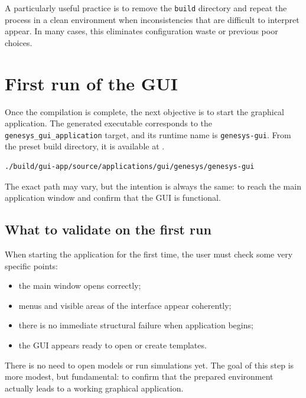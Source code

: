 A particularly useful practice is to remove the \texttt{build} directory and repeat the process in a clean environment when inconsistencies that are difficult to interpret appear. In many cases, this eliminates configuration waste or previous poor choices.

\section{First run of the GUI}
\label{sec:cap2_primeira_execucao_gui}

Once the compilation is complete, the next objective is to start the graphical application. The generated executable corresponds to the \texttt{genesys\_gui\_application} target, and its runtime name is \texttt{genesys-gui}. From the preset build directory, it is available at .

\begin{lstlisting}[language=bash,caption={Generic Example of the First GUI Run},label={lst:cap2_primeira_execucao_gui}]
./build/gui-app/source/applications/gui/genesys/genesys-gui
\end{lstlisting}

The exact path may vary, but the intention is always the same: to reach the main application window and confirm that the GUI is functional.

\subsection{What to validate on the first run}
\label{subsec:cap2_o_que_validar_primeira_execucao}

When starting the application for the first time, the user must check some very specific points:

\begin{itemize}
\item the main window opens correctly;
\item menus and visible areas of the interface appear coherently;
\item there is no immediate structural failure when application begins;
\item the GUI appears ready to open or create templates.
\end{itemize}

There is no need to open models or run simulations yet. The goal of this step is more modest, but fundamental: to confirm that the prepared environment actually leads to a working graphical application.

